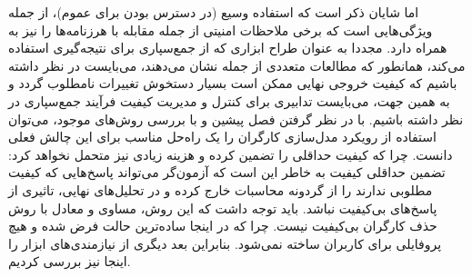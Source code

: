 اما شایان ذکر است که استفاده وسیع (در دسترس بودن برای عموم)، از جمله ویژگی‌هایی است که برخی ملاحظات امنیتی از جمله مقابله با هرزنامه‌ها را نیز به همراه دارد. مجددا به عنوان طراح ابزاری که از جمع‌سپاری برای نتیجه‌گیری استفاده می‌کند، همانطور که مطالعات متعددی از جمله
\cite{li_crowdsourced_2016}
نشان می‌دهند، می‌بایست در نظر داشته باشیم که کیفیت خروجی نهایی ممکن است بسیار دستخوش تغییرات نامطلوب گردد و به همین جهت، می‌بایست تدابیری برای کنترل و مدیریت کیفیت فرآیند جمع‌سپاری در نظر داشته باشیم. با در نظر گرفتن فصل پیشین و با بررسی روش‌های موجود، می‌توان استفاده از رویکرد مدل‌سازی کارگران را یک راه‌حل مناسب برای این چالش فعلی دانست. چرا که کیفیت حداقلی را تضمین کرده و هزینه زیادی نیز متحمل نخواهد کرد: تضمین حداقلی کیفیت به خاطر این است که آزمون‌گر می‌تواند پاسخ‌هایی که کیفیت مطلوبی ندارند را از گردونه محاسبات خارج کرده و در تحلیل‌های نهایی، تاثیری از پاسخ‌های بی‌کیفیت نباشد. باید توجه داشت که این روش، مساوی و معادل با روش حذف کارگران بی‌کیفیت نیست. چرا که در اینجا ساده‌ترین حالت فرض شده و هیچ پروفایلی برای کاربران ساخته نمی‌شود. بنابراین بعد دیگری از نیازمندی‌های ابزار را اینجا نیز بررسی کردیم.\\
